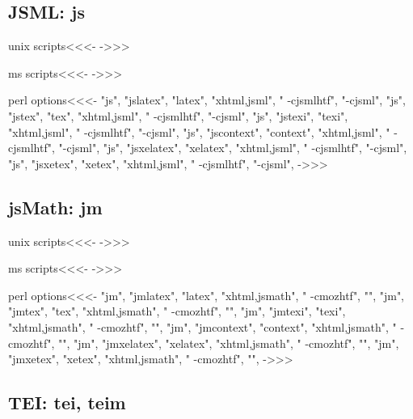 \documentclass{article}
\begin{document}
\subsection{JSML: js}

\<unix scripts\><<<-
->>>

\<ms scripts\><<<-
->>>


\<perl options\><<<-
 "js", "jslatex",   "latex",   "xhtml,jsml", " -cjsmlhtf",  "-cjsml",
 "js", "jstex",     "tex",     "xhtml,jsml", " -cjsmlhtf",  "-cjsml",
 "js", "jstexi",    "texi",    "xhtml,jsml", " -cjsmlhtf",  "-cjsml",
 "js", "jscontext", "context", "xhtml,jsml", " -cjsmlhtf",  "-cjsml",
 "js", "jsxelatex",   "xelatex",   "xhtml,jsml", " -cjsmlhtf",  "-cjsml",
 "js", "jsxetex",     "xetex",     "xhtml,jsml", " -cjsmlhtf",  "-cjsml",
->>>





\subsection{jsMath: jm}

\<unix scripts\><<<-
->>>

\<ms scripts\><<<-
->>>


\<perl options\><<<-
 "jm", "jmlatex",   "latex",   "xhtml,jsmath", " -cmozhtf", "",
 "jm", "jmtex",     "tex",     "xhtml,jsmath", " -cmozhtf", "",
 "jm", "jmtexi",    "texi",    "xhtml,jsmath", " -cmozhtf", "",
 "jm", "jmcontext", "context", "xhtml,jsmath", " -cmozhtf", "",
 "jm", "jmxelatex",   "xelatex",   "xhtml,jsmath", " -cmozhtf", "",
 "jm", "jmxetex",     "xetex",     "xhtml,jsmath", " -cmozhtf", "",
->>>








\subsection{TEI: tei, teim}
\end{document}
